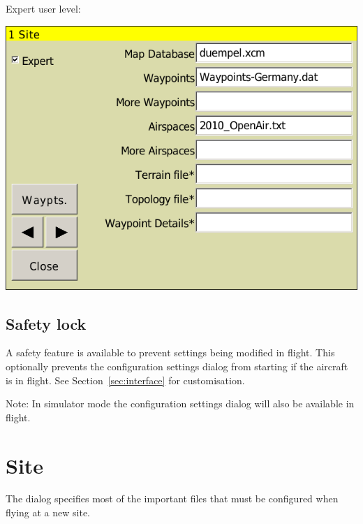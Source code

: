 \documentclass[a4paper,12pt]{refrep}
\begin{document}
Expert user level:
\begin{center}
\includegraphics[angle=0,width=\linewidth,keepaspectratio='true']{figures/config-expert.png}
\end{center}

\subsection*{Safety lock}

A safety feature is available to prevent settings being modified in
flight.  This optionally prevents the configuration settings dialog
from starting if the aircraft is in flight. See Section~\ref{sec:interface} for customisation.

Note: In simulator mode the configuration settings dialog will also be available in flight.



\clearpage
\section{Site}
The dialog specifies most of the important files that must be
configured when flying at a new site.
\end{document}

